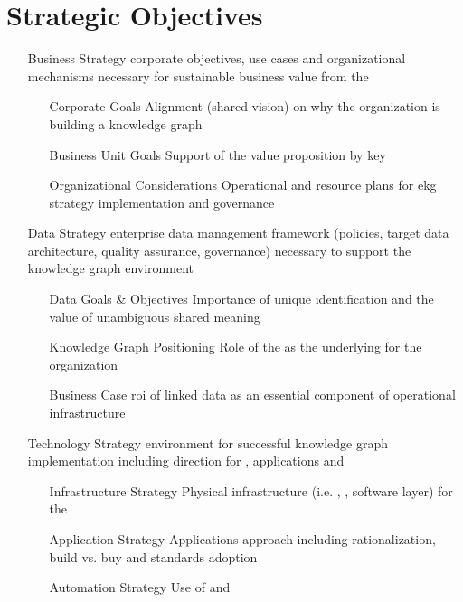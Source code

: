 \chapter{Strategic Objectives}
%
%
\begin{itemize}[leftmargin=2in,font=\bfseries]
  \item [Business Strategy] corporate objectives, use cases and organizational mechanisms necessary for sustainable business value from the 
  \begin{itemize}[labelwidth=1.5in,leftmargin=0in]
    \item [Corporate Goals] Alignment (shared vision) on why the organization is building a knowledge graph
    \item [Business Unit Goals] Support of the  value proposition by
          key  
    \item [Organizational Considerations] Operational and resource plans for \gls{ekg} strategy implementation and governance
  \end{itemize}
  \item [Data Strategy] enterprise data management framework (policies, target data architecture, quality assurance,
        governance) necessary to support the knowledge graph environment
    \begin{itemize}[labelwidth=1.5in,leftmargin=0in]
      \item [Data Goals \& Objectives] Importance of unique identification and the value of unambiguous shared meaning
      \item [Knowledge Graph Positioning] Role of the  as the underlying 
            for the organization
      \item [Business Case] \gls{roi} of linked data as an essential component of operational infrastructure
    \end{itemize}
  \item [Technology Strategy] environment for successful knowledge graph implementation including direction for
        , applications and 
    \begin{itemize}[labelwidth=1.5in,leftmargin=0in]
      \item [Infrastructure Strategy] Physical infrastructure (i.e. , ,
            software layer) for the 
      \item [Application Strategy] Applications approach including rationalization, build vs. buy and standards adoption
      \item [Automation Strategy] Use of  and 
    \end{itemize}
\end{itemize}

